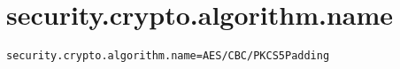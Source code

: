 \section{security.crypto.algorithm.name}
\label{configuration:SecurityCryptoAlgorithmName}
\ClearAPI
\TODO
{}
\begin{lstlisting}[style=Props,caption={Usage example for \textit{security.crypto.algorithm.name}}]
security.crypto.algorithm.name=AES/CBC/PKCS5Padding
\end{lstlisting}